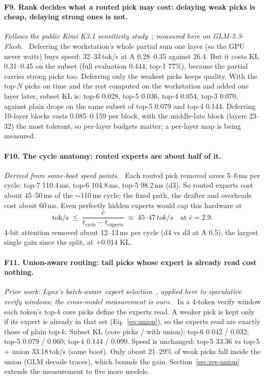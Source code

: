 \documentclass[11pt]{article}
\newcommand{\tps}{\,tok/s}
\newcommand{\ms}{\,ms}
\newcommand{\finding}[2]{\paragraph{#1}\emph{#2}\ }
\begin{document}
\finding{F9. Rank decides what a routed pick may cost: delaying weak picks is cheap, delaying strong ones is not.}{Follows
the public Kimi K3.1 sensitivity study~\citep{k31study}; measured here on GLM-5.3-Flash.}
Deferring the workstation's whole partial sum one layer (so the GPU never waits) buys speed: 32--33\tps{} at A
0.28--0.35 against 26.4. But it costs KL 0.31--0.45 on the subset (full evaluation 0.444, top-1 77\%), because the
partial carries strong picks too. Deferring only the weakest picks keeps quality. With the top-$N$ picks on time and the
rest computed on the workstation and added one layer later, subset KL is: top-6 0.028, top-5 0.036, top-4 0.054, top-3
0.070, against plain drops on the same subset of top-5 0.079 and top-4 0.144. Deferring 10-layer blocks costs
0.085--0.159 per block, with the middle-late block (layers 23--32) the most tolerant, so per-layer budgets matter; a
per-layer map is being measured.

\finding{F10. The cycle anatomy: routed experts are about half of it.}{Derived from same-boot speed points.}
Each routed pick removed saves 5--6\ms{} per cycle: top-7 110.4\ms, top-6 104.8\ms, top-5 98.2\ms{} (d3). So routed
experts cost about 45--50\ms{} of the $\sim$110\ms{} cycle; the fixed path, the drafter and overheads cost about 60\ms.
Even perfectly hidden experts would cap this hardware at
\begin{equation}
  \text{tok/s} \;\le\; \frac{\bar c}{t_{\text{cycle}} - t_{\text{experts}}} \;\approx\; 45\text{--}47\tps
  \quad\text{at } \bar c = 2.9 .
  \label{eq:cap}
\end{equation}
4-bit attention removed about 12--13\ms{} per cycle (d4 vs d3 at A 0.5), the largest single gain since the split, at
+0.014 KL.

\finding{F11. Union-aware routing: tail picks whose expert is already read cost nothing.}{Prior work: Lynx's batch-aware
expert selection~\citep{lynx}, applied here to speculative verify windows; the cross-model measurement is ours.}
In a 4-token verify window each token's top-$k$ core picks define the experts read. A weaker pick is kept only if its
expert is already in that set (Eq.~\eqref{eq:union}), so the experts read are exactly those of plain top-$k$. Subset KL
(core picks / with union): top-6 0.042 / 0.032; top-5 0.079 / 0.060; top-4 0.144 / 0.099. Speed is unchanged: top-5
33.36 vs top-5 + union 33.18\tps{} (same boot). Only about 21--29\% of weak picks fall inside the union (GLM decode
traces), which bounds the gain. Section~\ref{sec:res-union} extends the measurement to five more models.
\end{document}
